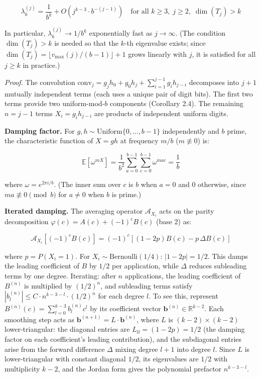 \documentclass[
  11pt,
]{article}
\begin{document}
\[\lambda_k^{(j)} = \frac{1}{b^k} + O\!\left(j^{k-3} \cdot b^{-(j-1)}\right) \quad \text{for all } k \geq 3, \; j \geq 2, \; \dim(T_j) > k\]

In particular, \(\lambda_k^{(j)} \to 1/b^k\) exponentially fast as
\(j \to \infty\). (The condition \(\dim(T_j) > k\) is needed so that the
\(k\)-th eigenvalue exists; since
\(\dim(T_j) = \lfloor v_{\max}(j)/(b-1) \rfloor + 1\) grows linearly with \(j\),
it is satisfied for all \(j \geq k\) in practice.)

\emph{Proof.} The convolution
\(\text{conv}_j = g_j h_0 + g_0 h_j + \sum_{i=1}^{j-1} g_i h_{j-i}\) decomposes
into \(j+1\) mutually independent terms (each uses a unique pair of digit bits).
The first two terms provide two uniform-mod-\(b\) components (Corollary 2.4).
The remaining \(n = j-1\) terms \(X_i = g_i h_{j-i}\) are products of
independent uniform digits.

\textbf{Damping factor.} For
\(g, h \sim \text{Uniform}\lbrace{}0, \ldots, b-1\rbrace{}\) independently and
\(b\) prime, the characteristic function of \(X = gh\) at frequency \(m/b\)
(\(m \not\equiv 0\)) is:

\[\mathbb{E}[\omega^{mX}] = \frac{1}{b^2}\sum_{a=0}^{b-1}\sum_{c=0}^{b-1} \omega^{mac} = \frac{1}{b}\]

where \(\omega = e^{2\pi i/b}\). (The inner sum over \(c\) is \(b\) when
\(a = 0\) and \(0\) otherwise, since \(ma \not\equiv 0 \pmod{b}\) for
\(a \neq 0\) when \(b\) is prime.)

\textbf{Iterated damping.} The averaging operator \(\mathcal{A}_{X_i}\) acts on
the parity decomposition \(\varphi(c) = A(c) + (-1)^c B(c)\) (base 2) as:

\[\mathcal{A}_{X_i}[(-1)^c B(c)] = (-1)^c\!\left[(1-2p)B(c) - p\,\Delta B(c)\right]\]

where \(p = P(X_i = 1)\). For \(X_i \sim \text{Bernoulli}(1/4)\):
\(|1 - 2p| = 1/2\). This damps the leading coefficient of \(B\) by \(1/2\) per
application, while \(\Delta\) reduces subleading terms by one degree. Iterating:
after \(n\) applications, the leading coefficient of \(B^{(n)}\) is multiplied
by \((1/2)^n\), and subleading terms satisfy
\(|b_l^{(n)}| \leq C \cdot n^{k-3-l} \cdot (1/2)^n\) for each degree \(l\). To
see this, represent \(B^{(n)}(c) = \sum_{l=0}^{k-3} b_l^{(n)} c^l\) by its
coefficient vector \(\boldsymbol{b}^{(n)} \in \mathbb{R}^{k-2}\). Each smoothing
step acts as \(\boldsymbol{b}^{(n+1)} = L \cdot \boldsymbol{b}^{(n)}\), where
\(L\) is \((k-2) \times (k-2)\) lower-triangular: the diagonal entries are
\(L_{ll} = (1 - 2p) = 1/2\) (the damping factor on each coefficient's leading
contribution), and the subdiagonal entries arise from the forward difference
\(\Delta\) mixing degree \(l+1\) into degree \(l\). Since \(L\) is
lower-triangular with constant diagonal \(1/2\), its eigenvalues are \(1/2\)
with multiplicity \(k-2\), and the Jordan form gives the polynomial prefactor
\(n^{k-3-l}\).
\end{document}
